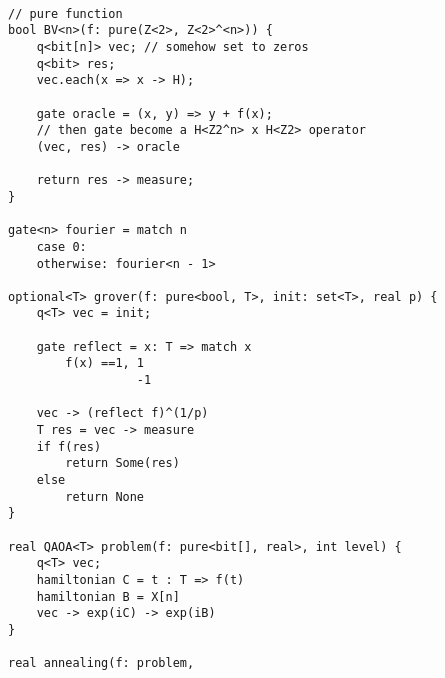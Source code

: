\documentclass[a4paper,11pt]{article}
\begin{document}
\begin{lstlisting}

// pure function
bool BV<n>(f: pure(Z<2>, Z<2>^<n>)) {
    q<bit[n]> vec; // somehow set to zeros
    q<bit> res;
    vec.each(x => x -> H);
    
    gate oracle = (x, y) => y + f(x);
    // then gate become a H<Z2^n> x H<Z2> operator
    (vec, res) -> oracle
    
    return res -> measure; 
}

gate<n> fourier = match n 
    case 0: 
    otherwise: fourier<n - 1>
    
optional<T> grover(f: pure<bool, T>, init: set<T>, real p) {
    q<T> vec = init;
    
    gate reflect = x: T => match x
        f(x) ==1, 1
                  -1
    
    vec -> (reflect f)^(1/p)
    T res = vec -> measure
    if f(res)
        return Some(res)
    else
        return None
}

real QAOA<T> problem(f: pure<bit[], real>, int level) {
    q<T> vec;
    hamiltonian C = t : T => f(t)
    hamiltonian B = X[n]
    vec -> exp(iC) -> exp(iB)
}

real annealing(f: problem, 

\end{lstlisting}
\end{document}
